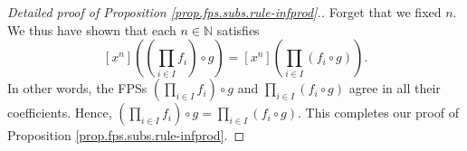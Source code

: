 \begin{proof}[Detailed proof of Proposition \ref{prop.fps.subs.rule-infprod}.]
Forget that we fixed $n$. We thus have shown that each $n\in\mathbb{N}$
satisfies%
\[
\left[  x^{n}\right]  \left(  \left(  \prod_{i\in I}f_{i}\right)  \circ
g\right)  =\left[  x^{n}\right]  \left(  \prod_{i\in I}\left(  f_{i}\circ
g\right)  \right)  .
\]
In other words, the FPSs $\left(  \prod_{i\in I}f_{i}\right)  \circ g$ and
$\prod_{i\in I}\left(  f_{i}\circ g\right)  $ agree in all their coefficients.
Hence, $\left(  \prod_{i\in I}f_{i}\right)  \circ g=\prod_{i\in I}\left(
f_{i}\circ g\right)  $. This completes our proof of Proposition
\ref{prop.fps.subs.rule-infprod}.
\end{proof}
